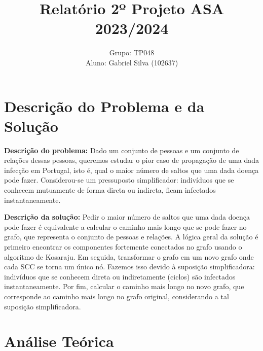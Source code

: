 \documentclass[12pt]{article}
\begin{document}
\title{Relatório 2º Projeto ASA 2023/2024}
\author{Grupo: TP048 \\ Aluno: Gabriel Silva (102637)}
\date{}
\maketitle

\section{Descrição do Problema e da Solução}

\textbf{Descrição do problema:}  Dado um conjunto de pessoas e um conjunto de relações dessas pessoas, queremos estudar o pior caso de propagação de uma dada infecção em Portugal, isto é, qual o maior número de saltos que uma dada doença pode fazer. Considerou-se um pressuposto simplificador: indivíduos que se conhecem mutuamente de forma direta ou indireta, ficam infectados instantaneamente.

\textbf{Descrição da solução:} Pedir o maior número de saltos que uma dada doença pode fazer é equivalente a calcular o caminho mais longo que se pode fazer no grafo, que representa o conjunto de pessoas e relações. A lógica geral da solução é primeiro encontrar os componentes fortemente conectados no grafo usando o algoritmo de Kosaraju. Em seguida, transformar o grafo em um novo grafo onde cada SCC se torna um único nó. Fazemos isso devido à suposição simplificadora: indivíduos que se conhecem direta ou indiretamente (ciclos) são infectados instantaneamente. Por fim, calcular o caminho mais longo no novo grafo, que corresponde ao caminho mais longo no grafo original, considerando a tal suposição simplificadora.

\section{Análise Teórica}
\end{document}
